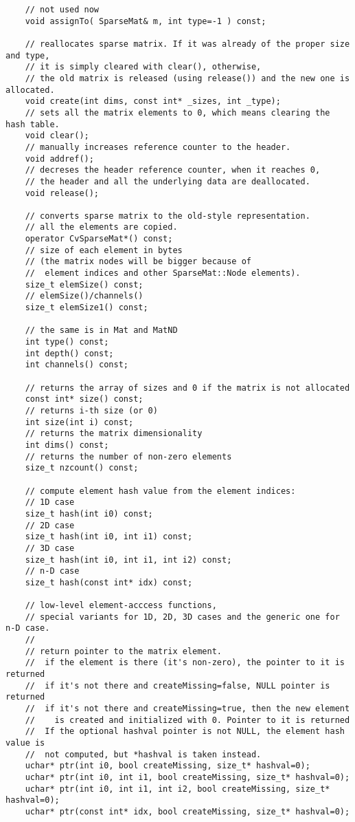 \begin{lstlisting}
    // not used now
    void assignTo( SparseMat& m, int type=-1 ) const;

    // reallocates sparse matrix. If it was already of the proper size and type,
    // it is simply cleared with clear(), otherwise,
    // the old matrix is released (using release()) and the new one is allocated.
    void create(int dims, const int* _sizes, int _type);
    // sets all the matrix elements to 0, which means clearing the hash table.
    void clear();
    // manually increases reference counter to the header.
    void addref();
    // decreses the header reference counter, when it reaches 0,
    // the header and all the underlying data are deallocated.
    void release();

    // converts sparse matrix to the old-style representation.
    // all the elements are copied.
    operator CvSparseMat*() const;
    // size of each element in bytes
    // (the matrix nodes will be bigger because of
    //  element indices and other SparseMat::Node elements).
    size_t elemSize() const;
    // elemSize()/channels()
    size_t elemSize1() const;
    
    // the same is in Mat and MatND
    int type() const;
    int depth() const;
    int channels() const;
    
    // returns the array of sizes and 0 if the matrix is not allocated
    const int* size() const;
    // returns i-th size (or 0)
    int size(int i) const;
    // returns the matrix dimensionality
    int dims() const;
    // returns the number of non-zero elements
    size_t nzcount() const;
    
    // compute element hash value from the element indices:
    // 1D case
    size_t hash(int i0) const;
    // 2D case
    size_t hash(int i0, int i1) const;
    // 3D case
    size_t hash(int i0, int i1, int i2) const;
    // n-D case
    size_t hash(const int* idx) const;
    
    // low-level element-acccess functions,
    // special variants for 1D, 2D, 3D cases and the generic one for n-D case.
    //
    // return pointer to the matrix element.
    //  if the element is there (it's non-zero), the pointer to it is returned
    //  if it's not there and createMissing=false, NULL pointer is returned
    //  if it's not there and createMissing=true, then the new element
    //    is created and initialized with 0. Pointer to it is returned
    //  If the optional hashval pointer is not NULL, the element hash value is
    //  not computed, but *hashval is taken instead.
    uchar* ptr(int i0, bool createMissing, size_t* hashval=0);
    uchar* ptr(int i0, int i1, bool createMissing, size_t* hashval=0);
    uchar* ptr(int i0, int i1, int i2, bool createMissing, size_t* hashval=0);
    uchar* ptr(const int* idx, bool createMissing, size_t* hashval=0);


\end{lstlisting}
